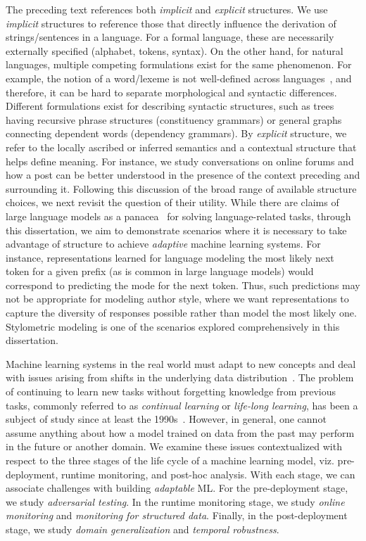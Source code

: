 The preceding text references both \textit{implicit} and \textit{explicit} structures. 
We use \textit{implicit} structures to reference those that directly influence the derivation of strings/sentences in a language.
For a formal language, these are necessarily externally specified (alphabet, tokens, syntax).
On the other hand, for natural languages, multiple competing formulations exist for the same phenomenon.
For example, the notion of a word/lexeme is not well-defined across languages~\cite{martin2017indeterminacy}, and therefore, it can be hard to separate morphological and syntactic differences. 
Different formulations exist for describing syntactic structures, such as trees having recursive phrase structures (constituency grammars) or general graphs connecting dependent words (dependency grammars).
By \textit{explicit} structure, we refer to the locally ascribed or inferred semantics and a contextual structure that helps define meaning.
For instance, we study conversations on online forums and how a post can be better understood in the presence of the context preceding and surrounding it.
Following this discussion of the broad range of available structure choices, we next revisit the question of their utility.
While there are claims of large language models as a panacea~\citep{bommasani2021foundationmodels} for solving language-related tasks, through this dissertation, we aim to demonstrate scenarios where it is necessary to take advantage of structure to achieve \textit{adaptive} machine learning systems.
For instance, representations learned for language modeling the most likely next token for a given prefix (as is common in large language models) would correspond to predicting the mode for the next token.
Thus, such predictions may not be appropriate for modeling author style, where we want representations to capture the diversity of responses possible rather than model the most likely one.
Stylometric modeling is one of the scenarios explored comprehensively in this dissertation.

Machine learning systems in the real world must adapt to new concepts and deal with issues arising from shifts in the underlying data distribution~\citep{huyen2022designing}.
The problem of continuing to learn new tasks without forgetting knowledge from previous tasks, commonly referred to as \textit{continual learning} or \textit{life-long learning}, has been a subject of study since at least the 1990s~\citep{thrun1998lifelong}.
However, in general, one cannot assume anything about how a model trained on data from the past may perform in the future or another domain. 
We examine these issues contextualized with respect to the three stages of the life cycle of a machine learning model, viz. pre-deployment, runtime monitoring, and post-hoc analysis.
With each stage, we can associate challenges with building \textit{adaptable} ML.
For the pre-deployment stage, we study \textit{adversarial testing}.
In the runtime monitoring stage, we study \textit{online monitoring} and \textit{monitoring for structured data}.
Finally, in the post-deployment stage, we study \textit{domain generalization} and \textit{temporal robustness}. 


